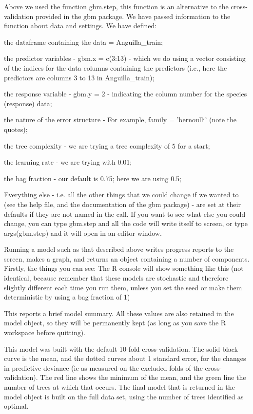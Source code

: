 \documentclass{article}
\begin{document}
Above we used the function gbm.step, this function is an alternative to the cross-validation provided in the gbm package.  
We have passed information to the function about data and settings. We have defined:

the dataframe containing the data = Anguilla\_train;

the predictor variables - gbm.x = c(3:13) -  which we do using a vector consisting of the indices for the data columns containing the predictors (i.e., here the predictors are columns 3 to 13 in Anguilla\_train);

the response variable - gbm.y = 2 -  indicating the column number for the species (response) data;

the nature of the error structure - For example,  family = 'bernoulli' (note the quotes); 

the tree complexity - we are trying a tree complexity of 5 for a start;

the learning rate - we are trying with 0.01;

the bag fraction - our default is 0.75; here we are using 0.5;

Everything else - i.e. all the other things that we could change if we wanted to (see the help file, and the documentation of the gbm package) - are set at their defaults if they are not named in the call. If you want to see what else you could change, you can type gbm.step and all the code will write itself to screen, or type args(gbm.step) and it will open in an editor window.

Running a model such as that described above writes progress reports to the screen, makes a graph, and returns an object containing a number of components. Firstly, the things you can see: The R console will show something like this (not identical, because remember that these models are stochastic and therefore slightly different each time you run them, unless you set the seed or make them deterministic by using a bag fraction of 1)

This reports a brief model summary. All these values are also retained in the model object, so they will be permanently kept (as long as you save the R workspace before quitting).

This model was built with the default 10-fold cross-validation. The solid black curve is the mean, and the dotted curves about 1 standard error, for the changes in predictive deviance (ie as measured on the excluded folds of the cross-validation). The red line shows the minimum of the mean, and the green line the number of trees at which that occurs. The final model that is returned in the model object is built on the full data set, using the number of trees identified as optimal. 
\end{document}
